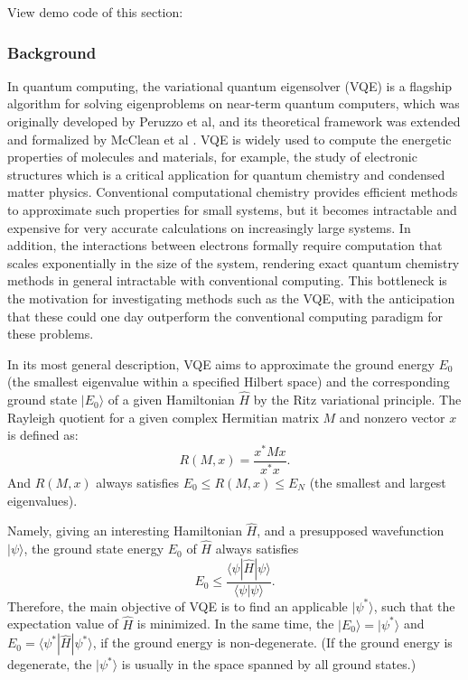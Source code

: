 
View demo code of this section: 

\subsubsection{Background}

In quantum computing, the variational quantum eigensolver (VQE) is a flagship algorithm for solving eigenproblems on near-term quantum computers, which was originally developed by Peruzzo et al, and its theoretical framework was extended and formalized by McClean et al \cite{Peruzzo2014Peruzzo2014}.
VQE is widely used to compute the energetic properties of molecules and materials, for example, the study of electronic structures which is a critical application for quantum chemistry and condensed matter physics.
Conventional computational chemistry provides efficient methods to approximate such properties for small systems, but it becomes intractable and expensive for very accurate calculations on increasingly large systems. In addition, the interactions between electrons formally require computation that scales exponentially in the size of the system, rendering exact quantum chemistry methods in general intractable with conventional computing.
This bottleneck is the motivation for investigating methods such as the VQE, with the anticipation that these could one day outperform the conventional computing paradigm for these problems.

In its most general description, VQE aims to approximate the ground energy $E_0$ (the smallest eigenvalue within a specified Hilbert space) and the corresponding ground state $|E_0\rangle$ of a given Hamiltonian $\hat{H}$ by the Ritz variational principle.
The Rayleigh quotient for a given complex Hermitian matrix $M$ and nonzero vector $x$ is defined as:
\begin{equation}
    R(M,x)=\frac{x^*Mx}{x^*x}.
\end{equation}
And $R(M,x)$ always satisfies $E_0\leq R(M,x)\leq E_N$ (the smallest and largest eigenvalues).

Namely, giving an interesting Hamiltonian $\hat{H}$, and a presupposed wavefunction $|\psi\rangle$, the ground state energy $E_{0}$ of $\hat{H}$ always satisfies
\begin{equation}
    E_0 \leq \frac{\langle \psi |\hat{H}| \psi \rangle}{\langle \psi |\psi\rangle}.
\end{equation}
Therefore, the main objective of VQE is to find an applicable $|\psi^*\rangle$, such that the expectation value of $\hat{H}$ is minimized. In the same time, the $|E_0\rangle = |\psi^*\rangle$ and $E_0 = \langle \psi^* |\hat{H}| \psi^* \rangle$, if the ground energy is non-degenerate. (If the ground energy is degenerate, the $|\psi^*\rangle$ is usually in the space spanned by all ground states.)

